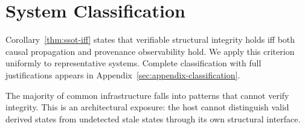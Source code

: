 \section{System Classification}\label{sec:evaluation}

Corollary~\ref{thm:ssot-iff} states that verifiable structural integrity holds iff both causal propagation and provenance observability hold. We apply this criterion uniformly to representative systems. Complete classification with full justifications appears in Appendix~\ref{sec:appendix-classification}.

The majority of common infrastructure falls into patterns that cannot verify integrity. This is an architectural exposure: the host cannot distinguish valid derived states from undetected stale states through its own structural interface.
